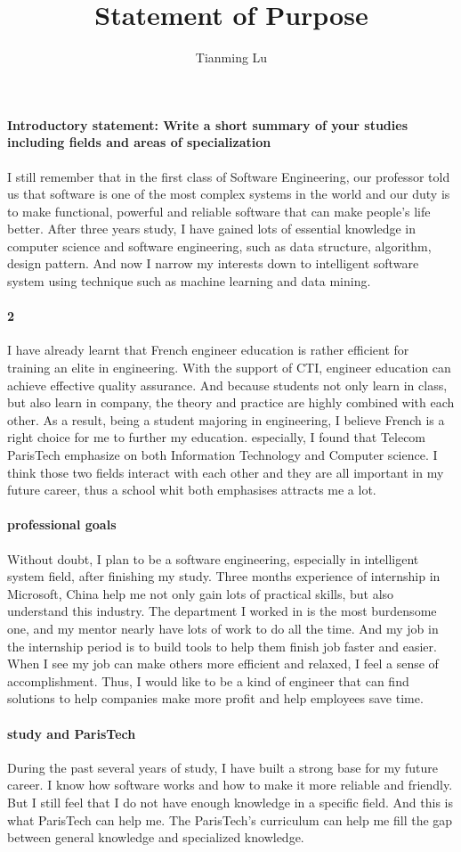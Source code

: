 \documentclass{article}
\title{Statement of Purpose}
\author{Tianming Lu}
\begin{document}
\maketitle
\paragraph{Introductory statement: Write a short summary of your studies including fields and areas of specialization}
I still remember that in the first class of Software Engineering, our professor told us that software is one of the most complex systems in the world and our duty is to make functional, powerful and reliable software that can make people's life better. After three years study, I have gained lots of essential knowledge in computer science and software engineering, such as data structure, algorithm, design pattern. And now I narrow my interests down to intelligent software system using technique such as machine learning and data mining.
\paragraph{2}
I have already learnt that French engineer education is rather efficient for training an elite in engineering. With the support of CTI, engineer education can achieve effective quality assurance. And because students not only learn in class, but also learn in company, the theory and practice are highly combined with each other. As a result, being a student majoring in engineering, I believe French is a right choice for me to further my education. especially, I found that Telecom ParisTech emphasize on both Information Technology and Computer science. I think those two fields interact with each other and they are all important in my future career, thus a school whit both emphasises attracts me a lot. 
\paragraph{professional goals}
Without doubt, I plan to be a software engineering, especially in intelligent system field, after finishing my study. Three months experience of internship in Microsoft, China help me not only gain lots of practical skills, but also understand this industry. The department I worked in is the most burdensome one, and my mentor nearly have lots of work to do all the time. And my job in the internship period is to build tools to help them finish job faster and easier. When I see my job can make others more efficient and relaxed, I feel a sense of accomplishment. Thus, I would like to be a kind of engineer that can find solutions to help companies make more profit and help employees save time.
\paragraph{study and ParisTech}   
During the past several years of study, I have built a strong base for my future career. I know how software works and how to make it more reliable and friendly. But I still feel that I do not have enough knowledge in a specific field. And this is what ParisTech can help me. The ParisTech's curriculum can help me fill the gap between general knowledge and specialized knowledge. 
\end{document}
